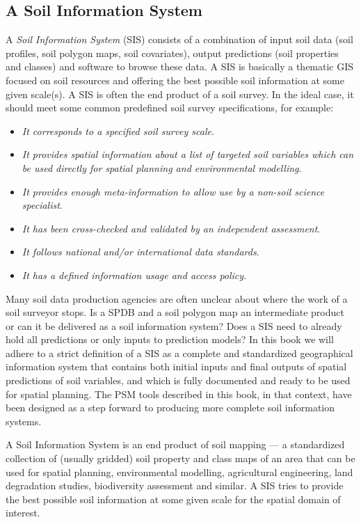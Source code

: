 \documentclass[11pt]{krantz}
\makeatletter
\newenvironment{kframe}{%
\medskip{}
\setlength{\fboxsep}{.8em}
 \def\at@end@of@kframe{}%
 \ifinner\ifhmode%
  \def\at@end@of@kframe{\end{minipage}}%
  \begin{minipage}{\columnwidth}%
 \fi\fi%
 \def\FrameCommand##1{\hskip\@totalleftmargin \hskip-\fboxsep
 \colorbox{shadecolor}{##1}\hskip-\fboxsep
     \hskip-\linewidth \hskip-\@totalleftmargin \hskip\columnwidth}%
 \MakeFramed {\advance\hsize-\width
   \@totalleftmargin\z@ \linewidth\hsize
   \@setminipage}}%
 {\par\unskip\endMakeFramed%
 \at@end@of@kframe}
\newenvironment{rmdblock}[1]
  {
  \begin{itemize}
  \renewcommand{\labelitemi}{
    \raisebox{-.7\height}[0pt][0pt]{
      {\setkeys{Gin}{width=3em,keepaspectratio}\texttt{[image: images/\#1]}}
    }
  }
  \setlength{\fboxsep}{1em}
  \begin{kframe}
  \item
  }
  {
  \end{kframe}
  \end{itemize}
  }
\newenvironment{rmdnote}
  {\begin{rmdblock}{note}}
  {\end{rmdblock}}
\theoremstyle{definition}
\theoremstyle{definition}
\theoremstyle{definition}
\theoremstyle{remark}
\makeatother
\begin{document}
\hypertarget{a-soil-information-system}{%
\subsection{A Soil Information System}\label{a-soil-information-system}}

A \emph{Soil Information System} (SIS) consists of a combination of
input soil data (soil profiles, soil polygon maps, soil covariates),
output predictions (soil properties and classes) and software to browse
these data. A SIS is basically a thematic GIS focused on soil resources
and offering the best possible soil information at some given scale(s).
A SIS is often the end product of a soil survey. In the ideal case, it
should meet some common predefined soil survey specifications, for
example:

\begin{itemize}
\item
  \emph{It corresponds to a specified soil survey scale}.
\item
  \emph{It provides spatial information about a list of targeted soil
  variables which can be used directly for spatial planning and
  environmental modelling}.
\item
  \emph{It provides enough meta-information to allow use by a non-soil
  science specialist}.
\item
  \emph{It has been cross-checked and validated by an independent
  assessment}.
\item
  \emph{It follows national and/or international data standards}.
\item
  \emph{It has a defined information usage and access policy}.
\end{itemize}

Many soil data production agencies are often unclear about where the
work of a soil surveyor stops. Is a SPDB and a soil polygon map an
intermediate product or can it be delivered as a soil information
system? Does a SIS need to already hold all predictions or only inputs
to prediction models? In this book we will adhere to a strict definition
of a SIS as a complete and standardized geographical information system
that contains both initial inputs and final outputs of spatial
predictions of soil variables, and which is fully documented and ready
to be used for spatial planning. The PSM tools described in this book,
in that context, have been designed as a step forward to producing more
complete soil information systems.

\begin{rmdnote}
A Soil Information System is an end product of soil mapping --- a
standardized collection of (usually gridded) soil property and class
maps of an area that can be used for spatial planning, environmental
modelling, agricultural engineering, land degradation studies,
biodiversity assessment and similar. A SIS tries to provide the best
possible soil information at some given scale for the spatial domain of
interest.
\end{rmdnote}
\end{document}
